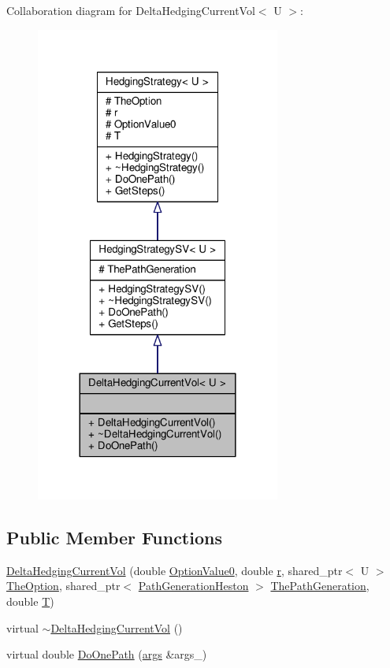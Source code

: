 Collaboration diagram for Delta\+Hedging\+Current\+Vol$<$ U $>$\+:
\nopagebreak
\begin{figure}[H]
\begin{center}
\leavevmode
\includegraphics[width=228pt]{classDeltaHedgingCurrentVol__coll__graph}
\end{center}
\end{figure}
\subsection*{Public Member Functions}
\begin{DoxyCompactItemize}
\item 
\hyperlink{classDeltaHedgingCurrentVol_addf10fb5cc82a446b879da2951525a43}{Delta\+Hedging\+Current\+Vol} (double \hyperlink{classHedgingStrategy_ac96528e9f4e5a0d1e5aadcc2ebdcab55}{Option\+Value0}, double \hyperlink{classHedgingStrategy_a313da7bc1911dba2a166d2c7bed5f1d7}{r}, shared\+\_\+ptr$<$ U $>$ \hyperlink{classHedgingStrategy_a65699a183423af9d947bb939ae8e907d}{The\+Option}, shared\+\_\+ptr$<$ \hyperlink{classPathGenerationHeston}{Path\+Generation\+Heston} $>$ \hyperlink{classHedgingStrategySV_aa341650c5b2846606e59e3e6c6225aca}{The\+Path\+Generation}, double \hyperlink{classHedgingStrategy_aedb4069f0709b49482a72b9d9c906a5e}{T})
\item 
virtual \hyperlink{classDeltaHedgingCurrentVol_adcd16ce7b2d61e715167ee2ee94315ce}{$\sim$\+Delta\+Hedging\+Current\+Vol} ()
\item 
virtual double \hyperlink{classDeltaHedgingCurrentVol_ad235325f348bd58eb54d9dec389aa2e9}{Do\+One\+Path} (\hyperlink{path__generation_8h_a75c13cde2074f502cc4348c70528572d}{args} \&args\+\_\+)
\end{DoxyCompactItemize}
